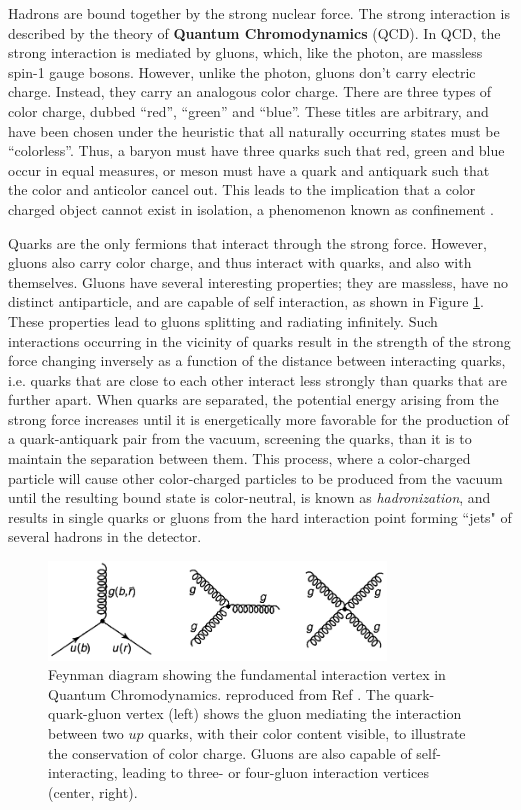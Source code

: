 \documentclass[11pt,a4paper,openright,twoside]{report}
\begin{document}
Hadrons are bound together by the strong nuclear force. The strong interaction is described by the theory of \textbf{Quantum Chromodynamics} (QCD). In QCD, the strong interaction is mediated by gluons, which, like the photon, are massless spin-1 gauge bosons. However, unlike the photon, gluons don't carry electric charge. Instead, they carry an analogous color charge. There are three types of color charge, dubbed ``red'', ``green'' and ``blue''. These titles are arbitrary, and have been chosen under the heuristic that all naturally occurring states must be ``colorless''. Thus, a baryon must have three quarks such that red, green and blue occur in equal measures, or meson must have a quark and antiquark such that the color and anticolor cancel out. This leads to the implication that a color charged object cannot exist in isolation, a phenomenon known as confinement \cite{confinement}.

Quarks are the only fermions that interact through the strong force. However, gluons also carry color charge, and thus interact with quarks, and also with themselves. Gluons have several interesting properties; they are massless, have no distinct antiparticle, and are capable of self interaction, as shown in Figure \ref{fig:qcd_fund_vertex}. These properties lead to gluons splitting and radiating infinitely. Such interactions occurring in the vicinity of quarks result in the strength of the strong force changing inversely as a function of the distance between interacting quarks, i.e. quarks that are close to each other interact less strongly than quarks that are further apart. When quarks are separated, the potential energy arising from the strong force increases until it is energetically more favorable for the production of a quark-antiquark pair from the vacuum, screening the quarks, than it is to maintain the separation between them. This process, where a color-charged particle will cause other color-charged particles to be produced from the vacuum until the resulting bound state is color-neutral, is known as \textit{hadronization}, and results in single quarks or gluons from the hard interaction point forming ``jets" of several hadrons in the detector.

\begin{figure}[h]
\centering
\includegraphics[width = 0.8\textwidth]{fundamental_vertex_qcd.png}
\caption{Feynman diagram showing the fundamental interaction vertex in Quantum Chromodynamics. reproduced from Ref \cite{griff}. The quark-quark-gluon vertex (left) shows the gluon mediating the interaction between two $up$ quarks, with their color content visible, to illustrate the conservation of color charge. Gluons are also capable of self-interacting, leading to three- or four-gluon interaction vertices (center, right).}
\label{fig:qcd_fund_vertex}
\end{figure}
\end{document}
